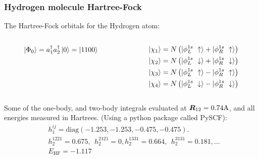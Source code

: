 \documentclass{beamer}
\renewcommand{\(}{\left(}
\renewcommand{\)}{\right)}
\renewcommand{\[}{\left[}
\renewcommand{\]}{\right]}
\begin{document}
\begin{frame}
    \frametitle{Hydrogen molecule Hartree-Fock}

    The Hartree-Fock orbitals for the Hydrogen atom: 
    \begin{columns}
        \begin{column}[]{0.5\textwidth}
            \centering
            \begin{align*}
                \ket{\Phi_0} = a^\dagger_1 a^\dagger_2 \ket{0} = \ket{1100}
            \end{align*}
        \end{column}
        \begin{column}[]{0.5\textwidth}
            \centering
            \begin{align*}
                \ket{\chi_1} = N\( \ket{\phi_L^{1s}\ \uparrow} +  \ket{\phi_R^{1s}\ \uparrow} \) \\ 
                \ket{\chi_2} = N\( \ket{\phi_L^{1s}\ \downarrow} +  \ket{\phi_R^{1s}\ \downarrow} \) \\ 
                \ket{\chi_3} = N\( \ket{\phi_L^{1s}\ \uparrow} -  \ket{\phi_R^{1s}\ \uparrow} \) \\ 
                \ket{\chi_4} = N\( \ket{\phi_L^{1s}\ \downarrow} -  \ket{\phi_R^{1s}\ \downarrow} \) 
            \end{align*}
        \end{column}
    \end{columns}
    Some of the one-body, and two-body integrals evaluated at $\bm R_{12} = 0.74 \textup{A}$, and all energies measured in Hartrees. (Using a python package called PySCF): 
    \begin{align*}
        &h_1^{ij} = \text{diag}(-1.253, -1.253, -0.475, -0.475). \\ 
        &h_2^{1221}  = 0.675, \ \  h_2^{2121} = 0, h_2^{1331} = 0.664, \ \  h_2^{3131} = 0.181, \dots \\ 
        & E_{\text{HF}} = -1.117 
    \end{align*} 
\end{frame}
\end{document}
